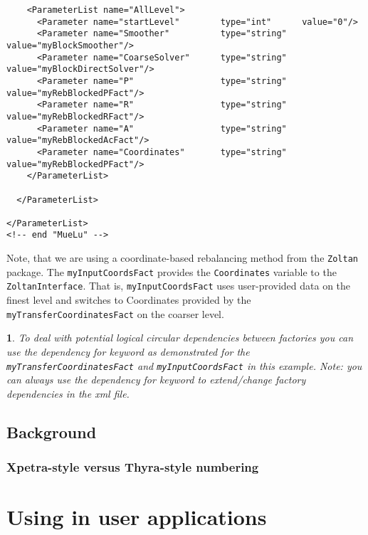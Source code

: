 \documentclass[10pt,fleqn]{book}
\newtheorem*{mycomment}{\ding{42}}
\begin{document}
\begin{lstlisting}
    <ParameterList name="AllLevel">
      <Parameter name="startLevel"        type="int"      value="0"/>
      <Parameter name="Smoother"          type="string"   value="myBlockSmoother"/>
      <Parameter name="CoarseSolver"      type="string"   value="myBlockDirectSolver"/>
      <Parameter name="P"                 type="string"   value="myRebBlockedPFact"/>
      <Parameter name="R"                 type="string"   value="myRebBlockedRFact"/>
      <Parameter name="A"                 type="string"   value="myRebBlockedAcFact"/>
      <Parameter name="Coordinates"       type="string"   value="myRebBlockedPFact"/>
    </ParameterList>

  </ParameterList>

</ParameterList>
<!-- end "MueLu" -->
\end{lstlisting}

Note, that we are using a coordinate-based rebalancing method from the \texttt{Zoltan} package. The \texttt{myInputCoordsFact} provides the \texttt{Coordinates} variable to the \texttt{ZoltanInterface}. That is, \texttt{myInputCoordsFact} uses user-provided data on the finest level and switches to Coordinates provided by the \texttt{myTransferCoordinatesFact} on the coarser level. 

\begin{mycomment}
To deal with potential logical circular dependencies between factories you can use the \textit{dependency for} keyword as demonstrated for the \texttt{myTransferCoordinatesFact} and \texttt{myInputCoordsFact} in this example. Note: you can always use the \textit{dependency for} keyword to extend/change factory dependencies in the xml file.
\end{mycomment}



\section{Background}

\subsection{Xpetra-style versus Thyra-style numbering}
\label{sec:xpetraversusthyra}


\chapter{Using \muelu in user applications}
\end{document}
